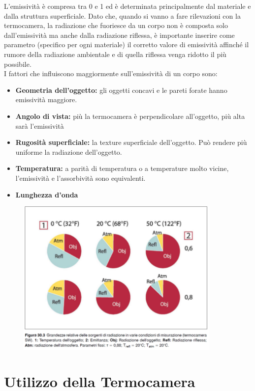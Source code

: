 L'emissività è compresa tra 0 e 1 ed è determinata principalmente dal materiale
e dalla struttura superficiale.
Dato che, quando si vanno a fare rilevazioni con la termocamera, la radiazione
che fuoriesce da un corpo non è composta solo dall'emissività ma anche dalla radiazione
riflessa, è importante inserire come parametro (specifico per ogni materiale) il corretto valore di emissività
affinché il rumore della radiazione ambientale e di quella riflessa venga ridotto il
più possibile.\\

I fattori che influiscono maggiormente sull'emissività di un corpo sono:

\begin{itemize}
    \item \textbf{Geometria dell'oggetto:} gli oggetti concavi e le pareti forate hanno
          emissività maggiore.
    \item \textbf{Angolo di vista:} più la termocamera è perpendicolare all'oggetto, più
          alta sarà l'emissività
    \item \textbf{Rugosità superficiale:} la texture superficiale dell'oggetto. Può rendere più
          uniforme la radiazione dell'oggetto.
    \item \textbf{Temperatura:} a parità di temperatura o a temperature molto vicine,
          l'emissività e l'assorbività sono equivalenti.
    \item \textbf{Lunghezza d'onda}
\end{itemize}

\begin{figure}[H]
    \centering
    \includegraphics[width=10cm, keepaspectratio]{capitoli/immagini/imgs/temptemp.png}
\end{figure}

\section{Utilizzo della Termocamera}

